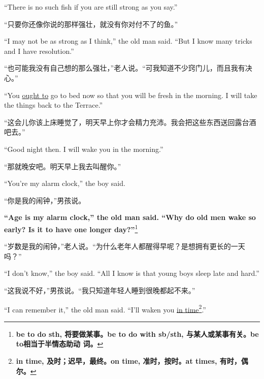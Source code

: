 \begin{paracol}{2}
\switchcolumn*

``There is no such fish if you are still strong as you say.''

\switchcolumn

“只要你还像你说的那样强壮，就没有你对付不了的鱼。”

\switchcolumn*

``I may not be as strong as I think,'' the old man said. ``But I know many tricks and I have \gls{resolution}.''

\switchcolumn

“也可能我没有自己想的那么强壮，”老人说。“可我知道不少窍门儿，而且我有决心。”

\switchcolumn*

``You \uline{ought to} go to bed now so that you will be \gls{fresh} in the
morning. I will take the things back to the Terrace.''

\switchcolumn

“这会儿你该上床睡觉了，明天早上你才会精力充沛。我会把这些东西送回露台酒吧去。”

\switchcolumn*

``Good night then. I will wake you in the morning.''

\switchcolumn

“那就晚安吧。明天早上我去叫醒你。”

\switchcolumn*

``You're my alarm clock,'' the boy said.

\switchcolumn

“你是我的闹钟，”男孩说。

\switchcolumn*

\textbf{``Age is my alarm clock,'' the old man said. ``Why do old men wake
  so early? Is it to have one longer day?''}\footnote{\textbf{be to do sth,
    将要做某事。be to do with sb/sth, 与某人或某事有关。be to相当于半情态助动
    词。}}

\switchcolumn

“岁数是我的闹钟，”老人说。“为什么老年人都醒得早呢？是想拥有更长的一天吗？”

\switchcolumn*

``I don't know,'' the boy said. ``All I know is that young boys sleep late and hard.''

\switchcolumn

“这我说不好，”男孩说。“我只知道年轻人睡到很晚都起不来。”

\switchcolumn*

``I can remember it,'' the old man said. ``I'll \gls{waken} you \uline{in
  time}\footnote{\textbf{in time, 及时；迟早，最终。on time, 准时，按时。at times, 有时，偶尔。}}.''


\end{paracol}
